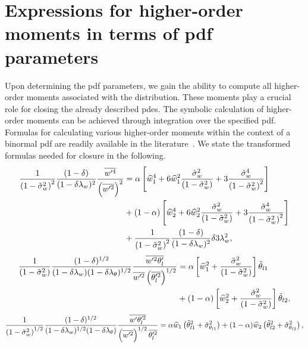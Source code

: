 \section{Expressions for higher-order moments in terms of pdf parameters}
\label{sec:expressions-for-higher-order-moments-in-terms-of-pdf-parameters}

Upon determining the \gls{pdf} parameters,
we gain the ability to compute all higher-order moments associated with the distribution.
These moments play a crucial role for closing the already described \glspl{pde}.
The symbolic calculation of higher-order moments can be achieved
through integration over the specified \gls{pdf}.
Formulas for calculating various higher-order moments within the context of a binormal \gls{pdf}
are readily available in the literature~\autocite{larson2005using}.
We state the transformed formulas needed for closure in the following.
\begin{align}
    \label{eq:wp4_div_wp2_2}
    \frac{1}{\left( 1 - \tilde{\sigma}_w^2 \right)^2} \frac{(1-\delta)}{(1-\delta \lambda_w)^2} \frac{\overline{w'^4}}{\left(\overline{w'^2} \right)^2}
    &= \alpha \left[\widehat{w}_1^4 +
    6 \widehat{w}_1^2 \frac{{\tilde{\sigma}_w}^2}{\left( 1 - \tilde{\sigma}_w^2 \right)} +
    3 \frac{{\tilde{\sigma}_w}^4}{\left( 1 - \tilde{\sigma}_w^2 \right)^2} \right] \nonumber \\
    &+ (1 - \alpha) \left[\widehat{w}_2^4 +
    6 \widehat{w}_2^2 \frac{{\tilde{\sigma}_w}^2}{\left( 1 - \tilde{\sigma}_w^2 \right)} +
    3 \frac{{\tilde{\sigma}_w}^4}{\left( 1 - \tilde{\sigma}_w^2 \right)^2} \right] \nonumber \\
    &+ \frac{1}{\left( 1 - \tilde{\sigma}_w^2 \right)^2} \frac{(1-\delta)}{(1-\delta \lambda_w)^2} \delta 3 \lambda_w^2,
\end{align}
\begin{align}
    \label{eq:wp2thlp_div_wp2thl2}
    \frac{1}{\left( 1 - \tilde{\sigma}_w^2 \right)} \frac{(1-\delta)^{1/2}}{(1-\delta \lambda_w) (1-\delta \lambda_\theta)^{1/2}}
    \frac{\overline{w'^2 \theta_l'}}{\overline{w'^2} \left(\overline{\theta_l'^2} \right)^{1/2}}
    &= \alpha \left[\widehat{w}_1^2 + \frac{{\tilde{\sigma}_w}^2}{\left( 1 - \tilde{\sigma}_w^2 \right)} \right] \tilde{\theta}_{l1} \nonumber\\
    &+ (1-\alpha) \left[\widehat{w}_2^2 + \frac{{\tilde{\sigma}_w}^2}{\left( 1 - \tilde{\sigma}_w^2 \right)}\right] \tilde{\theta}_{l2},
\end{align}
\begin{align}
    \label{eq:wpthlp2_div_wp2_thlp2}
    \frac{1}{\left( 1 - \tilde{\sigma}_w^2 \right)^{1/2}} \frac{(1-\delta)^{1/2}}{(1-\delta \lambda_w)^{1/2} (1-\delta \lambda_\theta)}
    \frac{\overline{w' \theta_l'^2}}{\left(\overline{w'^2}\right)^{1/2}\overline{\theta_l'^2}}
    = \alpha  \widehat{w}_1  \left( \tilde{\theta}_{l1}^2 + \tilde{\sigma}_{\theta_{l1}}^2 \right)
    + (1-\alpha) \widehat{w}_2 \left( \tilde{\theta}_{l2}^2 + \tilde{\sigma}_{\theta_{l2}}^2 \right),
\end{align}

